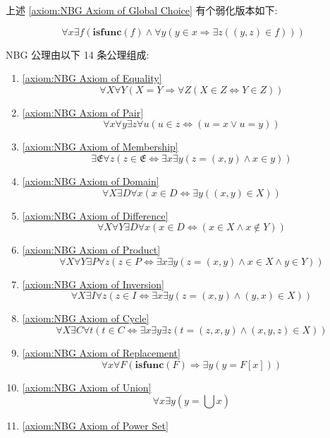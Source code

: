 上述 \ref{axiom:NBG Axiom of Global Choice} 有个弱化版本如下:

\begin{axiom*}
    \label {axiom:NBG Axiom of Choice}
    \[
        \forall x \exists f (\mathbf{isfunc} (f) \land \forall y (y \in x \Rightarrow \exists z ((y,z) \in f)))
    \]
\end{axiom*}

NBG 公理由以下 14 条公理组成:

\begin{enumerate}
    \item \ref{axiom:NBG Axiom of Equality} 
    \[
        \forall X \forall Y (X = Y \Rightarrow \forall Z (X \in Z \Leftrightarrow Y \in Z))
    \]
    \item \ref{axiom:NBG Axiom of Pair}
    \[
        \forall x \forall y \exists z \forall u (u \in z \Leftrightarrow (u = x \lor u = y))
    \]
    \item \ref{axiom:NBG Axiom of Membership}
    \[
        \exists \mathfrak{E} \forall z (z \in \mathfrak{E} \Leftrightarrow \exists x \exists y (z = (x,y) \land x \in y))
    \]
    \item \ref{axiom:NBG Axiom of Domain}
    \[
        \forall X \exists D \forall x (x \in D \Leftrightarrow \exists y ((x,y) \in X))
    \]
    \item \ref{axiom:NBG Axiom of Difference}
    \[
        \forall X \forall Y \exists D \forall x (x \in D \Leftrightarrow (x \in X \land x \notin Y))
    \]
    \item \ref{axiom:NBG Axiom of Product}
    \[
        \forall X \forall Y \exists P \forall z (z \in P \Leftrightarrow \exists x \exists y (z = (x,y) \land x \in X \land y \in Y))
    \]
    \item \ref{axiom:NBG Axiom of Inversion}
    \[
        \forall X \exists I \forall z (z \in I \Leftrightarrow \exists x \exists y (z = (x,y) \land (y,x) \in X))
    \]
    \item \ref{axiom:NBG Axiom of Cycle}
    \[
        \forall X \exists C \forall t (t \in C \Leftrightarrow \exists x \exists y \exists z (t = (z,x,y) \land (x,y,z) \in X))
    \]
    \item \ref{axiom:NBG Axiom of Replacement}
    \[
        \forall x \forall F (\mathbf{isfunc} (F) \Rightarrow \exists y (y = F[x]))
    \]
    \item \ref{axiom:NBG Axiom of Union}
    \[
        \forall x \exists y (y = \bigcup x)
    \]
    \item \ref{axiom:NBG Axiom of Power Set}

\end{enumerate}
